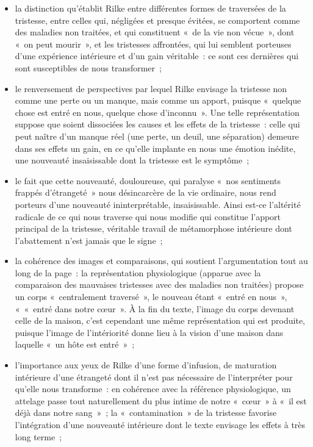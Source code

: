 {\begin{itemize}
\item la distinction qu'établit Rilke entre différentes formes de traversées de la
tristesse, entre celles qui, négligées et presque évitées, se comportent comme
des maladies non traitées, et qui constituent «~de la vie non vécue~», dont «~on
peut mourir~», et les tristesses affrontées, qui lui semblent porteuses d'une
expérience intérieure et d'un gain véritable~: ce sont ces dernières qui sont
susceptibles de nous transformer~;
\item le renversement de perspectives par lequel Rilke envisage la tristesse non
comme une perte ou un manque, mais comme un apport, puisque «~quelque
chose est entré en nous, quelque chose d'inconnu~». Une telle représentation suppose que soient dissociées les causes et les effets de la tristesse~: celle qui
peut naître d'un manque réel (une perte, un deuil, une séparation) demeure
dans ses effets un gain, en ce qu'elle implante en nous une émotion inédite,
une nouveauté insaisissable dont la tristesse est le symptôme~;
\item le fait que cette nouveauté, douloureuse, qui paralyse «~nos sentiments frappés
d'étrangeté~» nous désincarcère de la vie ordinaire, nous rend porteurs d'une
nouveauté ininterprétable, insaisissable. Ainsi est-ce l'altérité radicale de ce qui
nous traverse qui nous modifie qui constitue l'apport principal de la tristesse,
véritable travail de métamorphose intérieure dont l'abattement n'est jamais que
le signe~;
\item la cohérence des images et comparaisons, qui soutient l'argumentation tout au
long de la page~: la représentation physiologique (apparue avec la comparaison
des mauvaises tristesses avec des maladies non traitées) propose un corps
«~centralement traversé~», le nouveau étant «~entré en nous~», «~«~entré dans
notre cœur~». À la fin du texte, l'image du corps devenant celle de la maison,
c'est cependant une même représentation qui est produite, puisque l'image de
l'intériorité donne lieu à la vision d'une maison dans laquelle «~un hôte est
entré~»~;
\item l'importance aux yeux de Rilke d'une forme d'infusion, de maturation intérieure
d'une étrangeté dont il n'est pas nécessaire de l'interpréter pour qu'elle nous
transforme~: en cohérence avec la référence physiologique, un attelage passe
tout naturellement du plus intime de notre «~cœur~» à «~il est déjà dans notre
sang~»~; la «~contamination~» de la tristesse favorise l'intégration d'une
nouveauté intérieure dont le texte envisage les effets à très long terme~;

\end{itemize}}
